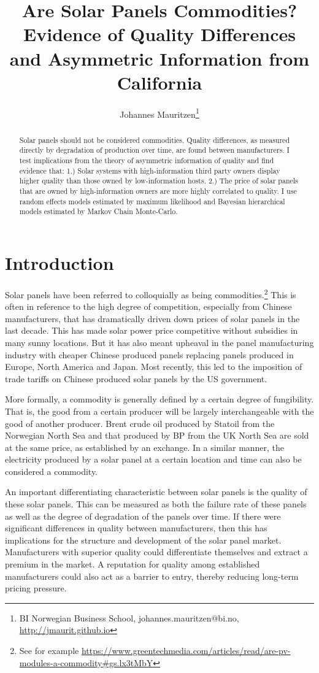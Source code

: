 \documentclass[a4paper]{article}
\title{Are Solar Panels Commodities? Evidence of Quality Differences and Asymmetric Information from California}
\author{Johannes Mauritzen\thanks{BI Norwegian Business School, johannes.mauritzen@bi.no, \url{http://jmaurit.github.io}}}
\begin{document}
\maketitle

\begin{abstract}
Solar panels should not be considered commodities. Quality differences, as measured directly by degradation of production over time, are found between manufacturers. I test implications from the theory of asymmetric information of quality and find evidence that: 1.) Solar systems with high-information third party owners display higher quality than those owned by low-information hosts. 2.) The price of solar panels that are owned by high-information owners are more highly correlated to quality. I use random effects models estimated by maximum likelihood and Bayesian hierarchical models estimated by Markov Chain Monte-Carlo.
\end{abstract}

\newpage{}

\section{Introduction}

Solar panels have been referred to colloquially as being commodities.\footnote{See for example \url{https://www.greentechmedia.com/articles/read/are-pv-modules-a-commodity\#gs.lx3tMbY}} This is often in reference to the high degree of competition, especially from Chinese manufacturers, that has dramatically driven down prices of solar panels in the last decade. This has made solar power price competitive without subsidies in many sunny locations. But it has also meant upheaval in the panel manufacturing industry with cheaper Chinese produced panels replacing panels produced in Europe, North America and Japan. Most recently, this led to the imposition of trade tariffs on Chinese produced solar panels by the US government.

More formally, a commodity is generally defined by a certain degree of fungibility. That is, the good from a certain producer will be largely interchangeable with the good of another producer. Brent crude oil produced by Statoil from the Norwegian North Sea and that produced by BP from the UK North Sea are sold at the same price, as established by an exchange. In a similar manner, the electricity produced by a solar panel at a certain location and time can also be considered a commodity.

An important differentiating characteristic between solar panels is the quality of these solar panels. This can be measured as both the failure rate of these panels as well as the degree of degradation of the panels over time. If there were significant differences in quality between manufacturers, then this has implications for the structure and development of the solar panel market. Manufacturers with superior quality could differentiate themselves and extract a premium in the market. A reputation for quality among established manufacturers could also act as a barrier to entry, thereby reducing long-term pricing pressure.
\end{document}
